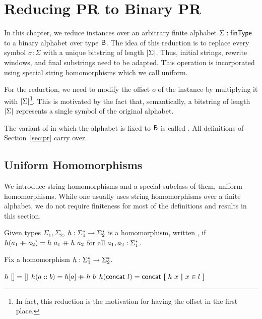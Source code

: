 \newcommand{\strentD}[1]{\ensuremath{\rightsquigarrow^D}}
\newcommand{\FlatPR}{\textbf{FlatPR}}

\chapter{Reducing PR to Binary PR}\label{chap:pr_bpr}
In this chapter, we reduce \PR{} instances over an arbitrary finite alphabet $\Sigma : \textsf{finType}$ to a binary alphabet over type $\textsf{B}$. The idea of this reduction is to replace every symbol $\sigma : \Sigma$ with a unique bitstring of length $|\Sigma|$. 
Thus, initial strings, rewrite windows, and final substrings need to be adapted.
This operation is incorporated using special string homomorphisms which we call uniform.

For the reduction, we need to modify the offset $o$ of the \PR{} instance by multiplying it with $|\Sigma|$\footnote{In fact, this reduction is the motivation for having the offset in the first place.}. This is motivated by the fact that, semantically, a bitstring of length $|\Sigma|$ represents a single symbol of the original alphabet.

The variant of \PR{} in which the alphabet is fixed to $\textsf{B}$ is called \BPR{}. All definitions of Section~\ref{sec:pr} carry over.

\section{Uniform Homomorphisms}
We introduce string homomorphisms and a special subclass of them, uniform homomorphisms.
While one usually uses string homomorphisms over a finite alphabet, we do not require finiteness for most of the definitions and results in this section.

\newcommand{\homomorphism}{\textsf{homomorphism}}
\begin{definition}
  Given types $\Sigma_1, \Sigma_2$, $h : \Sigma_1^* \rightarrow \Sigma_2^*$ is a homomorphism, written \mnotec[homomorphism]{$\homomorphism~h$}, if $h (a_1 \mathbin{+\mkern-10mu+} a_2) = h~a_1 \mathbin{+\mkern-10mu+} h~a_2$ for all $a_1, a_2 : \Sigma_1^*$. 
\end{definition}

\begin{fact}
  Fix a homomorphism $h : \Sigma_1^* \rightarrow \Sigma_2^*$. 
  \begin{enumerate}
     $h~[] = []$
     $h (a :: b) = h [a] \mathbin{+\mkern-10mu+} h~b$
     $h (\textsf{concat}~l) = \textsf{concat}~\textbf{[}~ h~x ~\textbf{|}~ x \in l ~\textbf{]}$
  \end{enumerate}
\end{fact}


